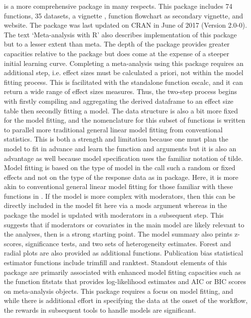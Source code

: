 \documentclass[softwarereview]{jss}
\begin{document}
 is a more comprehensive package in many respects.  This package includes 74 functions, 35 datasets, a vignette \citep{RN4896}, function flowchart as secondary vignette, and website.  The package was last updated on CRAN in June of 2017 (Version 2.0-0).  The text ‘Meta-analysis with R’ also describes implementation of this package \citep{RN6199} but to a lesser extent than meta.  The depth of the package  provides greater capacities relative to the  package but does come at the expense of a steeper initial learning curve.  Completing a meta-analysis using this package requires an additional step, i.e. effect sizes must be calculated a priori, not within the model fitting process.  This is facilitated with the standalone function escalc, and it can return a wide range of effect sizes measures. Thus, the two-step process begins with firstly compiling and aggregating the derived dataframe to an effect size table then secondly fitting a model.  The data structure is also a bit more fixed for the model fitting, and the nomenclature for this subset of functions is written to parallel more traditional general linear model fitting from conventional statistics.  This is both a strength and limitation because one must plan the model to fit in advance and learn the function and arguments but it is also an advantage as well because model specification uses the familiar notation of tilde.  Model fitting is based on the type of model in the call such a random or fixed effects and not on the type of the response data as in  package.  Here, it is more akin to conventional general linear model fitting for those familiar with these functions in .  If the model is more complex with moderators, then this can be directly included in the model fit here via a mods argument whereas in the  package the model is updated with moderators in a subsequent step.  This suggests that if moderators or covariates in the main model are likely relevant to the analyses, then  is a strong starting point.  The model summary also prints z-scores, significance tests, and two sets of heterogeneity estimates.  Forest and radial plots are also provided as additional functions.  Publication bias statistical estimator functions include trimfill and ranktest.  Standout elements of this package are primarily associated with enhanced model fitting capacities such as the function fitstats that provides log-likelihood estimates and AIC or BIC scores on meta-analysis objects.  This package requires a focus on model fitting, and while there is additional effort in specifying the data at the onset of the workflow, the rewards in subsequent tools to handle models are significant.  \newline
\end{document}
